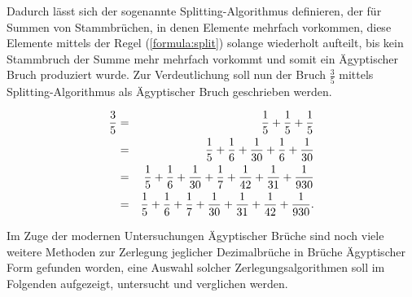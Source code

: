 Dadurch lässt sich der sogenannte Splitting-Algorithmus definieren, der für Summen von Stammbrüchen, in denen Elemente mehrfach vorkommen, diese Elemente mittels der Regel (\ref{formula:split}) solange wiederholt aufteilt, bis kein Stammbruch der Summe mehr mehrfach vorkommt und somit ein Ägyptischer Bruch produziert wurde. Zur Verdeutlichung soll nun der Bruch $\frac{3}{5}$ mittels Splitting-Algorithmus als Ägyptischer Bruch geschrieben werden.
\begin{bsp}
	{
	\begin{eqnarray*}
		\frac{3}{5} & = & \frac{1}{5} +\frac{1}{5} +\frac{1}{5}\\
		& = & \frac{1}{5} + \frac{1}{6} + \frac{1}{30} + \frac{1}{6} + \frac{1}{30}\\
		& = & \frac{1}{5} + \frac{1}{6} + \frac{1}{30} + \frac{1}{7} + \frac{1}{42} + \frac{1}{31} + \frac{1}{930}\\
		& = & \frac{1}{5} + \frac{1}{6} + \frac{1}{7} + \frac{1}{30} + \frac{1}{31} + \frac{1}{42} + \frac{1}{930}.\\
	\end{eqnarray*}}
\end{bsp}


Im Zuge der modernen Untersuchungen Ägyptischer Brüche sind noch viele weitere Methoden zur Zerlegung jeglicher Dezimalbrüche in Brüche Ägyptischer Form gefunden worden, eine Auswahl solcher Zerlegungsalgorithmen soll im Folgenden aufgezeigt, untersucht und verglichen werden.